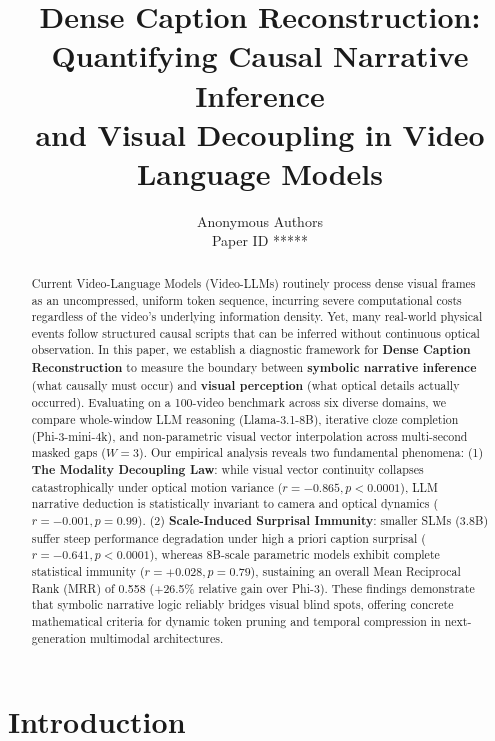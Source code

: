\documentclass[10pt,twocolumn,letterpaper]{article}
\def\paperID{*****} %
\begin{document}
\title{Dense Caption Reconstruction: Quantifying Causal Narrative Inference\\and Visual Decoupling in Video Language Models}

\author{Anonymous Authors\\
Paper ID \paperID
}

\maketitle

\begin{abstract}
Current Video-Language Models (Video-LLMs) routinely process dense visual frames as an uncompressed, uniform token sequence, incurring severe computational costs regardless of the video's underlying information density. Yet, many real-world physical events follow structured causal scripts that can be inferred without continuous optical observation. In this paper, we establish a diagnostic framework for \textbf{Dense Caption Reconstruction} to measure the boundary between \textbf{symbolic narrative inference} (what causally must occur) and \textbf{visual perception} (what optical details actually occurred). Evaluating on a 100-video benchmark across six diverse domains, we compare whole-window LLM reasoning (Llama-3.1-8B), iterative cloze completion (Phi-3-mini-4k), and non-parametric visual vector interpolation across multi-second masked gaps (\(W=3\)).
Our empirical analysis reveals two fundamental phenomena:
(1) \textbf{The Modality Decoupling Law}: while visual vector continuity collapses catastrophically under optical motion variance (\(r = -0.865, p < 0.0001\)), LLM narrative deduction is statistically invariant to camera and optical dynamics (\(r = -0.001, p = 0.99\)).
(2) \textbf{Scale-Induced Surprisal Immunity}: smaller SLMs (3.8B) suffer steep performance degradation under high a priori caption surprisal (\(r = -0.641, p < 0.0001\)), whereas 8B-scale parametric models exhibit complete statistical immunity (\(r = +0.028, p = 0.79\)), sustaining an overall Mean Reciprocal Rank (MRR) of 0.558 (+26.5\% relative gain over Phi-3).
These findings demonstrate that symbolic narrative logic reliably bridges visual blind spots, offering concrete mathematical criteria for dynamic token pruning and temporal compression in next-generation multimodal architectures.
\end{abstract}

\section{Introduction}
\label{sec:intro}
\end{document}
